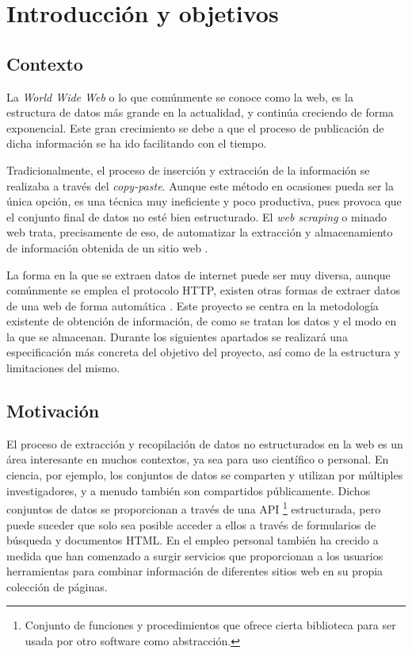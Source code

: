 \chapter{Introducción y objetivos}
\label{cha:introduccion y objetivos}

\section{Contexto}
\label{sec:contexto}

La \emph{World Wide Web} o lo que comúnmente se conoce como la web, es la estructura de datos más grande 
en la actualidad, y continúa creciendo de forma exponencial. Este gran crecimiento se debe a que el proceso 
de publicación de dicha información se ha ido facilitando con el tiempo.

Tradicionalmente, el proceso de inserción y extracción de la información se realizaba a través del
\emph{copy-paste}. Aunque este método en ocasiones pueda ser la única opción, es una técnica muy 
ineficiente y poco productiva, pues provoca que el conjunto final de datos no esté bien estructurado. El 
\emph{web scraping} o minado web trata, precisamente de eso, de automatizar la extracción y almacenamiento 
de información obtenida de un sitio web \cite{Andreas-Mehlfuhrer}.

La forma en la que se extraen datos de internet puede ser muy diversa, aunque comúnmente se emplea el
protocolo HTTP, existen otras formas de extraer datos de una web de forma automática
\cite{web-scraping-bozhao}. Este proyecto se centra en la metodología existente de obtención de
información, de como se tratan los datos y el modo en la que se almacenan. Durante los siguientes
apartados se realizará una especificación más concreta del objetivo del proyecto, así como de la
estructura y limitaciones del mismo.

\section{Motivación}
\label{sec:motivacion}

El proceso de extracción y recopilación de datos no estructurados en la web es un área interesante en
muchos contextos, ya sea para uso científico o personal. En ciencia, por ejemplo, los conjuntos de datos
se comparten y utilizan por múltiples investigadores, y a menudo también son compartidos públicamente.
Dichos conjuntos de datos se proporcionan a través de una API \footnote{Conjunto de funciones
y procedimientos que ofrece cierta biblioteca para ser usada por otro software como abstracción.}
estructurada, pero puede suceder que solo sea posible acceder a ellos a través de formularios de búsqueda
y documentos HTML. En el empleo personal también ha crecido a medida que han comenzado a surgir servicios 
que proporcionan a los usuarios herramientas para combinar información de diferentes sitios web en su propia
colección de páginas.

